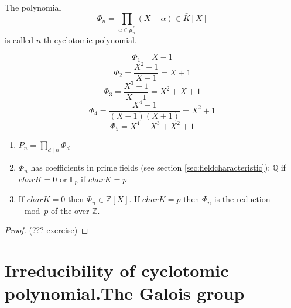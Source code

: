 \begin{definition}
  The polynomial
  \[
  \Phi_n = \prod_{\alpha \in \mu_n^*}\left(X - \alpha\right) \in \bar{K}\left[X\right]
  \]
  is called $n$-th cyclotomic polynomial.
  \label{def:cyclotomicpolynomial}
\end{definition}

\begin{example}
  \[
  \Phi_1 = X - 1
  \]
  \[
  \Phi_2 = \frac{X^2 - 1}{X-1} = X + 1
  \]
  \[
  \Phi_3 = \frac{X^3 - 1}{X-1} = X^2 + X + 1
  \]
  \[
  \Phi_4 = \frac{X^4 - 1}{\left(X-1\right)\left(X + 1\right)} = X^2 + 1
  \]
  \[
  \Phi_5 = X^4 + X^3 + X^2 + 1
  \]  
\end{example}

\begin{proposition}
  \begin{enumerate}
    \item 
      \(
      P_n = \prod_{d \mid n} \Phi_d
      \)
    \item $\Phi_n$ has coefficients in prime fields (see section
      \ref{sec:fieldcharacteristic}): $\mathbb{Q}$ if $char K = 0$ or
      $\mathbb{F}_p$ if $char K = p$
    \item If $char K = 0$ then $\Phi_n \in
      \mathbb{Z}\left[X\right]$. If $char K = p$ then $\Phi_n$ is the
      reduction $\mod{p}$ of the 
      over $\mathbb{Z}$.
  \end{enumerate}
  \begin{proof}
    (??? exercise)
  \end{proof}
\end{proposition}

\section{Irreducibility of cyclotomic polynomial.The Galois group}

